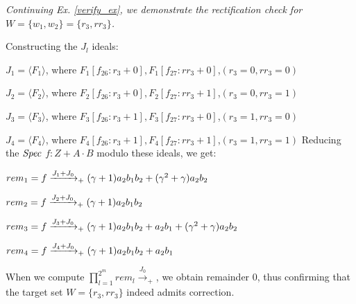 \begin{Example}
\label{ex:3}
{\it 
Continuing Ex. \ref{verify_ex}, we
demonstrate the rectification check for $W= \{w_1,w_2\} = \{r_3,rr_3\}$. 

Constructing the $J_l$ ideals:
\bi
\item $J_1 = \langle F_1\rangle$, where $F_1[f_{26}: r_3+0],F_1[f_{27}: rr_3 + 0]$,$(r_3 =0, rr_3 = 0)$ 
\item $J_2 = \langle F_2\rangle$, where $F_2[f_{26}: r_3+0],F_2[f_{27}: rr_3 + 1]$,$(r_3 =0, rr_3 = 1)$
\item $J_3 = \langle F_3\rangle$, where $F_3[f_{26}: r_3+1],F_3[f_{27}: rr_3 + 0]$,$(r_3 =1, rr_3 = 0)$
\item $J_4 = \langle F_4\rangle$, where $F_4[f_{26}: r_3+1],F_4[f_{27}: rr_3 + 1]$,$(r_3 =1, rr_3 = 1)$
\ei
Reducing the ${\it Spec}$ $f: Z+A\cdot B$ modulo these ideals, we get:
\bi
\item $rem_1 = f \xrightarrow[]{J_1 + J_{0}}_+(\gamma+1)a_2b_1b_2+(\gamma^2+\gamma)a_2b_2$
\item $rem_2 = f \xrightarrow[]{J_2 + J_{0}}_+(\gamma+1)a_2b_1b_2$
\item $rem_3 = f \xrightarrow[]{J_3 + J_{0}}_+(\gamma+1)a_2b_1b_2+a_2b_1 + (\gamma^2+\gamma)a_2b_2$
\item $rem_4 = f \xrightarrow[]{J_4 + J_{0}}_+(\gamma+1)a_2b_1b_2+a_2b_1$
\ei

When we compute $\prod_{l=1}^{2^m} 
rem_l\xrightarrow{J_{0}}_+$, 
 we obtain remainder 0, thus confirming
that the target set $W=\{r_3,rr_3\}$ indeed admits correction.
}
\end{Example}


